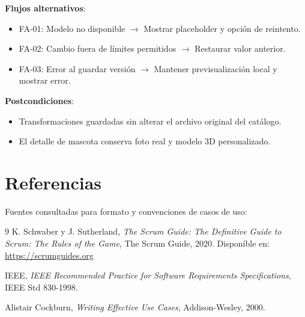 \documentclass[12pt,a4paper]{article}
\begin{document}
\textbf{Flujos alternativos}:
\begin{itemize}[leftmargin=*]
    \item FA-01: Modelo no disponible $\rightarrow$ Mostrar placeholder y opci\'on de reintento.
    \item FA-02: Cambio fuera de l\'imites permitidos $\rightarrow$ Restaurar valor anterior.
    \item FA-03: Error al guardar versi\'on $\rightarrow$ Mantener previsualizaci\'on local y mostrar error.
\end{itemize}

\textbf{Postcondiciones}:
\begin{itemize}[leftmargin=*]
    \item Transformaciones guardadas sin alterar el archivo original del cat\'alogo.
    \item El detalle de mascota conserva foto real y modelo 3D personalizado.
\end{itemize}

\newpage
\section{Referencias}
Fuentes consultadas para formato y convenciones de casos de uso:
\begin{thebibliography}{9}
K. Schwaber y J. Sutherland,
\textit{The Scrum Guide: The Definitive Guide to Scrum: The Rules of the Game},
The Scrum Guide, 2020. Dispon\'ible en: \url{https://scrumguides.org}

IEEE,
\textit{IEEE Recommended Practice for Software Requirements Specifications},
IEEE Std 830-1998.

Alistair Cockburn,
\textit{Writing Effective Use Cases}, Addison-Wesley, 2000.
\end{thebibliography}
\end{document}

